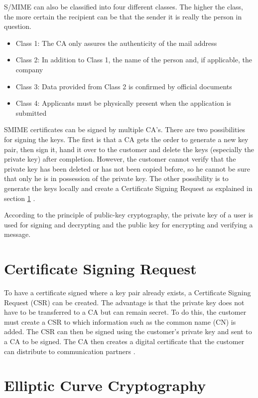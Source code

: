\documentclass[12pt,oneside,a4paper,parskip]{scrbook}
\begin{document}
S/MIME can also be classified into four different classes. The higher the class, the more certain the recipient can be that the sender it is really the person in question.
\begin{itemize}
    \item Class 1: The CA only assures the authenticity of the mail address
    \item Class 2: In addition to Class 1, the name of the person and, if applicable, the company
    \item Class 3: Data provided from Class 2 is confirmed by official documents
    \item Class 4: Applicants must be physically present when the application is submitted
\end{itemize}

SMIME certificates can be signed by multiple CA's. There are two possibilities for signing the keys. The first is that a CA gets the order to generate a new key pair, then sign it, hand it over to the customer and delete the keys (especially the private key) after completion. However, the customer cannot verify that the private key has been deleted or has not been copied before, so he cannot be sure that only he is in possession of the private key. The other possibility is to generate the keys locally and create a Certificate Signing Request as explained in section \ref{sec:CSR} \parencite{luber_smime_2018}.

According to the principle of public-key cryptography, the private key of a user is used for signing and decrypting and the public key for encrypting and verifying a message.

\section{Certificate Signing Request}
\label{sec:CSR}

To have a certificate signed where a key pair already exists, a Certificate Signing Request (CSR) can be created. The advantage is that the private key does not have to be transferred to a CA but can remain secret. To do this, the customer must create a CSR to which information such as the common name (CN) is added. The CSR can then be signed using the customer's private key and sent to a CA to be signed. The CA then creates a digital certificate that the customer can distribute to communication partners \parencite{publico_ssl-grundlagen_2017}.

\section{Elliptic Curve Cryptography}
\end{document}
